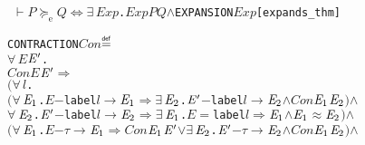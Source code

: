 \documentclass[GCNS]{yincog}
\renewcommand{\HOLConst}[1]{\texttt{#1}}
\renewcommand{\HOLBoundVar}[1]{\ensuremath{\mathit{#1}}}
\renewcommand{\HOLFreeVar}[1]{\ensuremath{\mathit{#1}}}
\renewcommand{\HOLSymConst}[1]{#1}
\renewcommand{\HOLTokenConj}{\ensuremath{\wedge}}
\renewcommand{\HOLTokenDefEquality}{\ensuremath{\mathrel{\overset{\makebox [0pt]{\text{\tiny \textsf{def}}}}{=}}}}
\renewcommand{\HOLTokenEquiv}{\ensuremath{\Longleftrightarrow}}
\renewcommand{\HOLTokenExists}{\ensuremath{\exists \,}}
\renewcommand{\HOLTokenForall}{\ensuremath{\forall \,}}
\renewcommand{\HOLTokenTurnstile}{\ensuremath{\:\:\vdash}}
\renewcommand{\HOLTokenDisj}{\ensuremath{\vee}}
\theoremstyle{remark}
\theoremstyle{theorem}
\theoremstyle{remark}
\newcommand{\HOLTokenWeakEQ}{$\approx$}
\newcommand{\HOLTokenTransBegin}{$-$}
\newcommand{\HOLTokenTransEnd}{$\rightarrow$\xspace}
\newcommand{\HOLTokenWeakTransBegin}{$=$}
\newcommand{\HOLTokenWeakTransEnd}{$\Rightarrow$\xspace}
\newcommand{\HOLTokenExpands}{$\succeq_{\mathrm{e}}\!$}
\renewcommand{\HOLTokenImp}{\ensuremath{\Longrightarrow}}
\begin{document}
\begin{alltt}
\HOLTokenTurnstile{} \HOLFreeVar{P} \HOLSymConst{\HOLTokenExpands{}} \HOLFreeVar{Q} \HOLSymConst{\HOLTokenEquiv{}} \HOLSymConst{\HOLTokenExists{}}\HOLBoundVar{Exp}. \HOLBoundVar{Exp} \HOLFreeVar{P} \HOLFreeVar{Q} \HOLSymConst{\HOLTokenConj{}} \HOLConst{EXPANSION} \HOLBoundVar{Exp}\hfill{[expands\_thm]}
\end{alltt}

\begin{alltt}
   \HOLConst{CONTRACTION} \HOLFreeVar{Con} \HOLTokenDefEquality{}
     \HOLSymConst{\HOLTokenForall{}}\HOLBoundVar{E} \ensuremath{\HOLBoundVar{E}\sp{\prime}}.
         \HOLFreeVar{Con} \HOLBoundVar{E} \ensuremath{\HOLBoundVar{E}\sp{\prime}} \HOLSymConst{\HOLTokenImp{}}
         \ensuremath{(}\HOLSymConst{\HOLTokenForall{}}\HOLBoundVar{l}.
              \ensuremath{(}\HOLSymConst{\HOLTokenForall{}}\ensuremath{\HOLBoundVar{E}\sb{\mathrm{1}}}. \HOLBoundVar{E} \HOLTokenTransBegin\HOLConst{label} \HOLBoundVar{l}\HOLTokenTransEnd \ensuremath{\HOLBoundVar{E}\sb{\mathrm{1}}} \HOLSymConst{\HOLTokenImp{}} \HOLSymConst{\HOLTokenExists{}}\ensuremath{\HOLBoundVar{E}\sb{\mathrm{2}}}. \ensuremath{\HOLBoundVar{E}\sp{\prime}} \HOLTokenTransBegin\HOLConst{label} \HOLBoundVar{l}\HOLTokenTransEnd \ensuremath{\HOLBoundVar{E}\sb{\mathrm{2}}} \HOLSymConst{\HOLTokenConj{}} \HOLFreeVar{Con} \ensuremath{\HOLBoundVar{E}\sb{\mathrm{1}}} \ensuremath{\HOLBoundVar{E}\sb{\mathrm{2}}}\ensuremath{)} \HOLSymConst{\HOLTokenConj{}}
              \HOLSymConst{\HOLTokenForall{}}\ensuremath{\HOLBoundVar{E}\sb{\mathrm{2}}}. \ensuremath{\HOLBoundVar{E}\sp{\prime}} \HOLTokenTransBegin\HOLConst{label} \HOLBoundVar{l}\HOLTokenTransEnd \ensuremath{\HOLBoundVar{E}\sb{\mathrm{2}}} \HOLSymConst{\HOLTokenImp{}} \HOLSymConst{\HOLTokenExists{}}\ensuremath{\HOLBoundVar{E}\sb{\mathrm{1}}}. \HOLBoundVar{E} \HOLTokenWeakTransBegin\HOLConst{label} \HOLBoundVar{l}\HOLTokenWeakTransEnd \ensuremath{\HOLBoundVar{E}\sb{\mathrm{1}}} \HOLSymConst{\HOLTokenConj{}} \ensuremath{\HOLBoundVar{E}\sb{\mathrm{1}}} \HOLSymConst{\HOLTokenWeakEQ} \ensuremath{\HOLBoundVar{E}\sb{\mathrm{2}}}\ensuremath{)} \HOLSymConst{\HOLTokenConj{}}
         \ensuremath{(}\HOLSymConst{\HOLTokenForall{}}\ensuremath{\HOLBoundVar{E}\sb{\mathrm{1}}}. \HOLBoundVar{E} \HOLTokenTransBegin\HOLSymConst{\ensuremath{\tau}}\HOLTokenTransEnd \ensuremath{\HOLBoundVar{E}\sb{\mathrm{1}}} \HOLSymConst{\HOLTokenImp{}} \HOLFreeVar{Con} \ensuremath{\HOLBoundVar{E}\sb{\mathrm{1}}} \ensuremath{\HOLBoundVar{E}\sp{\prime}} \HOLSymConst{\HOLTokenDisj{}} \HOLSymConst{\HOLTokenExists{}}\ensuremath{\HOLBoundVar{E}\sb{\mathrm{2}}}. \ensuremath{\HOLBoundVar{E}\sp{\prime}} \HOLTokenTransBegin\HOLSymConst{\ensuremath{\tau}}\HOLTokenTransEnd \ensuremath{\HOLBoundVar{E}\sb{\mathrm{2}}} \HOLSymConst{\HOLTokenConj{}} \HOLFreeVar{Con} \ensuremath{\HOLBoundVar{E}\sb{\mathrm{1}}} \ensuremath{\HOLBoundVar{E}\sb{\mathrm{2}}}\ensuremath{)} \HOLSymConst{\HOLTokenConj{}}

\end{alltt}
\end{document}
